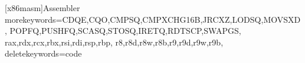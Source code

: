 \usepackage{listings}
\usepackage{xcolor}

\newcommand{\F}{Fig.}
\newcommand{\E}{Eq.}
\newcommand{\T}{Table}
\renewcommand{\S}{Sec.}
\newcommand{\A}{Alg.}

\newcommand{\fixme}[1]{{\color{blue}\textbf{#1}}}


   [x86masm]{Assembler} %
   {morekeywords={CDQE,CQO,CMPSQ,CMPXCHG16B,JRCXZ,LODSQ,MOVSXD, %
                  POPFQ,PUSHFQ,SCASQ,STOSQ,IRETQ,RDTSCP,SWAPGS, %
                  rax,rdx,rcx,rbx,rsi,rdi,rsp,rbp, %
                  r8,r8d,r8w,r8b,r9,r9d,r9w,r9b},
    deletekeywords={code}} %



\lstset{escapechar=@,style=customasm,language=[x64]Assembler}
